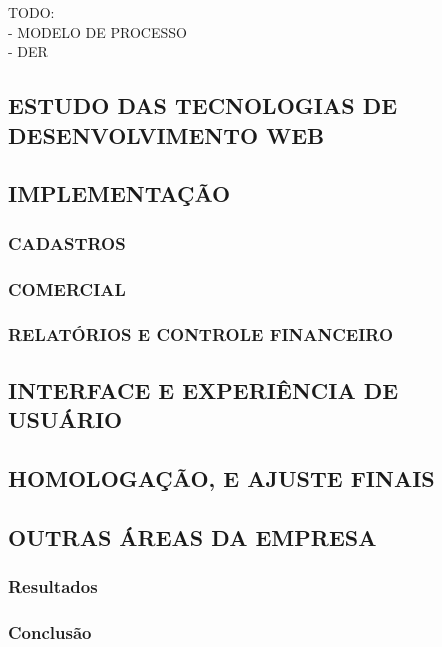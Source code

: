 \documentclass[
  12pt,				%
  openany,
  oneside,
  a4paper,			%
  english,			%
  brazil
]{article}
\numberwithin{figure}{section}
\numberwithin{table}{section}
\begin{document}
\noindent TODO: \\
- MODELO DE PROCESSO \\
- DER \\







\subsection{ESTUDO DAS TECNOLOGIAS DE DESENVOLVIMENTO WEB}

\subsection{IMPLEMENTAÇÃO}

  \subsubsection{CADASTROS}
  
  \subsubsection{COMERCIAL}
  
  \subsubsection{RELATÓRIOS E CONTROLE FINANCEIRO}


\subsection{INTERFACE E EXPERIÊNCIA DE USUÁRIO}

\subsection{HOMOLOGAÇÃO, E AJUSTE FINAIS}

\subsection{OUTRAS ÁREAS DA EMPRESA}



\subsubsection{Resultados}
\subsubsection{Conclusão}
\end{document}
